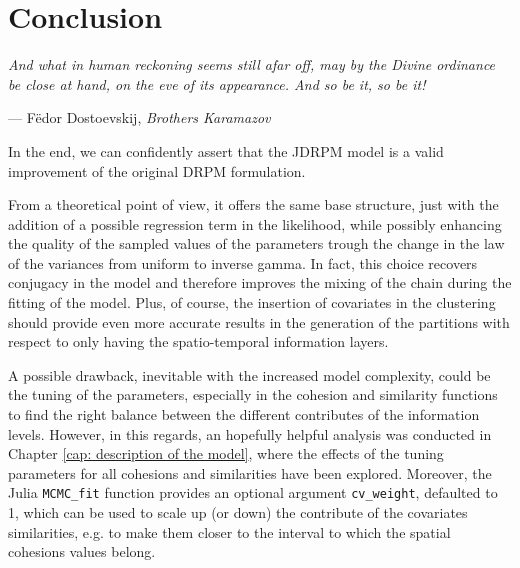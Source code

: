 \documentclass[12pt,	%
	a4paper,		%
	twoside,		%
	openright,		%
	titlepage,%
	]{book}
\theoremstyle{definition}
\newcommand{\mjline}[1]{\texttt{#1}}
\begin{document}
\chapter{Conclusion}
\label{chap: conclusion}

\setlength{}
\epigraph{\itshape
And what in human reckoning seems still afar off, may by the Divine ordinance be close at hand, on the eve of its appearance. And so be it, so be it!
}{--- F\"{e}dor Dostoevskij, \textit{Brothers Karamazov}}
\setlength{}

In the end, we can confidently assert that the JDRPM model is a valid improvement of the original DRPM formulation. 

From a theoretical point of view, it offers the same base structure, just with the addition of a possible regression term in the likelihood, while possibly enhancing the quality of the sampled values of the parameters trough the change in the law of the variances from uniform to inverse gamma. In fact, this choice recovers conjugacy in the model and therefore improves the mixing of the chain during the fitting of the model. Plus, of course, the insertion of covariates in the clustering should provide even more accurate results in the generation of the partitions with respect to only having the spatio-temporal information layers.

A possible drawback, inevitable with the increased model complexity, could be the tuning of the parameters, especially in the cohesion and similarity functions to find the right balance between the different contributes of the information levels. However, in this regards, an hopefully helpful analysis was conducted in Chapter \ref{cap: description of the model}, where the effects of the tuning parameters for all cohesions and similarities have been explored. Moreover, the Julia \mjline{MCMC_fit} function provides an optional argument \mjline{cv_weight}, defaulted to 1, which can be used to scale up (or down) the contribute of the covariates similarities, e.g. to make them closer to the interval to which the spatial cohesions values belong. 
\end{document}
